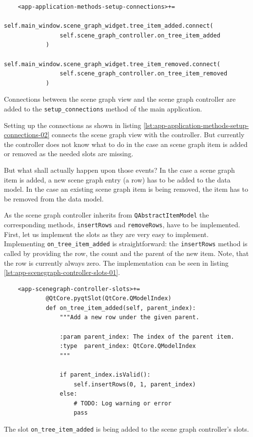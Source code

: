 \documentclass[10pt, openright, notitlepage]{scrreprt}
\begin{document}
\begin{listing}[H]
\begin{verbatim}
    <app-application-methods-setup-connections>+=
            self.main_window.scene_graph_widget.tree_item_added.connect(
                self.scene_graph_controller.on_tree_item_added
            )
            self.main_window.scene_graph_widget.tree_item_removed.connect(
                self.scene_graph_controller.on_tree_item_removed
            )
\end{verbatim}
\caption{\label{lst:app-application-methods-setup-connections-02}
Connections between the scene graph view and the scene graph controller are added to the \texttt{setup\_connections} method of the main application.}
\end{listing}

Setting up the connections as shown in listing
\ref{lst:app-application-methods-setup-connections-02} connects the scene graph view
with the controller. But currently the controller does not know what to do in
the case an scene graph item is added or removed as the needed slots are
missing.

But what shall actually happen upon those events? In the case a scene graph item
is added, a new scene graph entry (a row) has to be added to the data model. In
the case an existing scene graph item is being removed, the item has to be
removed from the data model.

As the scene graph controller inherits from \texttt{QAbstractItemModel} the
corresponding methods, \texttt{insertRows} and \texttt{removeRows}, have
to be implemented. First, let us implement the slots as they are very easy to
implement. Implementing \texttt{on\_tree\_item\_added} is straightforward: the
\texttt{insertRows} method is called by providing the row, the count and
the parent of the new item. Note, that the row is currently always zero. The
implementation can be seen in listing
\ref{lst:app-scenegraph-controller-slots-01}.

\begin{listing}[H]
\begin{verbatim}
    <app-scenegraph-controller-slots>+=
            @QtCore.pyqtSlot(QtCore.QModelIndex)
            def on_tree_item_added(self, parent_index):
                """Add a new row under the given parent.
            
                :param parent_index: The index of the parent item.
                :type  parent_index: QtCore.QModelIndex
                """
            
                if parent_index.isValid():
                    self.insertRows(0, 1, parent_index)
                else:
                    # TODO: Log warning or error
                    pass
\end{verbatim}
\caption{\label{lst:app-scenegraph-controller-slots-01}
The slot \texttt{on\_tree\_item\_added} is being added to the scene graph controller's slots.}
\end{listing}
\end{document}
